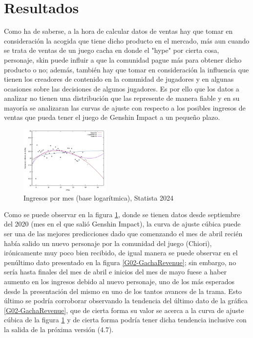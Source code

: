 \documentclass[osajnl,twocolumn,showpacs,superscriptaddress,10pt]{revtex4-2}
\begin{document}
\section{Resultados}
Como ha de saberse, a la hora de calcular datos de ventas hay que tomar en consideración la acogida que tiene dicho producto en el mercado, más aun cuando se trata de ventas de un juego cacha en donde el "hype" por cierta cosa, personaje, skin puede influir a que la comunidad pague más para obtener dicho producto o no; además, también hay que tomar en consideración la influencia que tienen los creadores de contenido en la comunidad de jugadores y en algunas ocasiones sobre las decisiones de algunos jugadores. Es por ello que los datos a analizar no tienen una distribución que las represente de manera fiable y en su mayoría se analizaran las curvas de ajuste con respecto a los posibles ingresos de ventas que pueda tener el juego de Genshin Impact a un pequeño plazo.
\begin{figure}[H]
    \begin{center}
        \includegraphics[width=0.4\textwidth]{img/GIRev01.pdf}
        \caption{\label{G01-statista}Ingresos por mes (base logarítmica), Statista 2024}
    \end{center}
\end{figure}
Como se puede observar en la figura \ref{G01-statista}, donde se tienen datos desde septiembre del 2020 (mes en el que salió Genshin Impact), la curva de ajuste cúbica puede ser una de las mejores predicciones dado que comenzando el mes de abril recién había salido un nuevo personaje por la comunidad del juego (Chiori), irónicamente muy poco bien recibido, de igual manera se puede observar en el penúltimo dato presentado en la figura \ref{G02-GachaRevenue}; sin embargo, no sería hasta finales del mes de abril e inicios del mes de mayo fuese a haber aumento en los ingresos debido al nuevo personaje, uno de los más esperados desde la presentación del mismo en uno de los tantos avances de la trama. Esto último se podría corroborar observando la tendencia del último dato de la gráfica \ref{G02-GachaRevenue}, que de cierta forma su valor se acerca a la curva de ajuste cúbica de la figura \ref{G01-statista} y de cierta forma podría tener dicha tendencia inclusive con la salida de la próxima versión (4.7).
\end{document}
